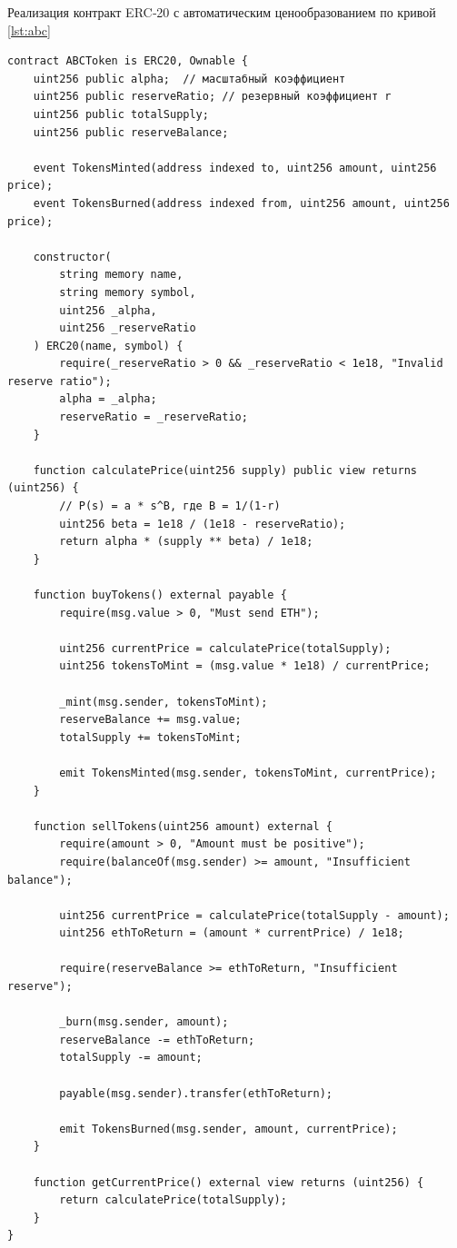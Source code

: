 \documentclass[
    14pt,
    specialist,
    candidate, %
    subf, %
    href,
    dotsinheaders=false
]{disser}
\begin{document}
Реализация контракт ERC‑20 с автоматическим ценообразованием по кривой \ref{lst:abc}
\begin{lstlisting}[language=Solidity, caption={Пример реализации ERC-20 с ABC}, label={lst:abc}]
contract ABCToken is ERC20, Ownable {
    uint256 public alpha;  // масштабный коэффициент
    uint256 public reserveRatio; // резервный коэффициент r
    uint256 public totalSupply;
    uint256 public reserveBalance;

    event TokensMinted(address indexed to, uint256 amount, uint256 price);
    event TokensBurned(address indexed from, uint256 amount, uint256 price);

    constructor(
        string memory name,
        string memory symbol,
        uint256 _alpha,
        uint256 _reserveRatio
    ) ERC20(name, symbol) {
        require(_reserveRatio > 0 && _reserveRatio < 1e18, "Invalid reserve ratio");
        alpha = _alpha;
        reserveRatio = _reserveRatio;
    }

    function calculatePrice(uint256 supply) public view returns (uint256) {
        // P(s) = a * s^B, где B = 1/(1-r)
        uint256 beta = 1e18 / (1e18 - reserveRatio);
        return alpha * (supply ** beta) / 1e18;
    }

    function buyTokens() external payable {
        require(msg.value > 0, "Must send ETH");

        uint256 currentPrice = calculatePrice(totalSupply);
        uint256 tokensToMint = (msg.value * 1e18) / currentPrice;

        _mint(msg.sender, tokensToMint);
        reserveBalance += msg.value;
        totalSupply += tokensToMint;

        emit TokensMinted(msg.sender, tokensToMint, currentPrice);
    }

    function sellTokens(uint256 amount) external {
        require(amount > 0, "Amount must be positive");
        require(balanceOf(msg.sender) >= amount, "Insufficient balance");

        uint256 currentPrice = calculatePrice(totalSupply - amount);
        uint256 ethToReturn = (amount * currentPrice) / 1e18;

        require(reserveBalance >= ethToReturn, "Insufficient reserve");

        _burn(msg.sender, amount);
        reserveBalance -= ethToReturn;
        totalSupply -= amount;

        payable(msg.sender).transfer(ethToReturn);

        emit TokensBurned(msg.sender, amount, currentPrice);
    }

    function getCurrentPrice() external view returns (uint256) {
        return calculatePrice(totalSupply);
    }
}
\end{lstlisting}
\end{document}
